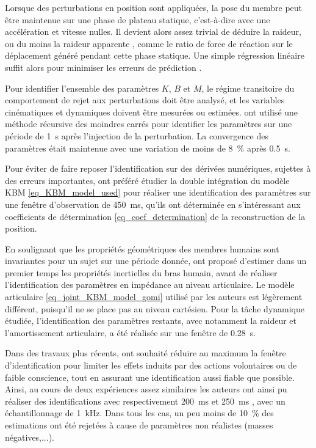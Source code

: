 Lorsque des perturbations en position sont appliquées, la pose du membre peut être maintenue sur une phase de plateau statique, c'est-à-dire avec une accélération et vitesse nulles. Il devient alors assez trivial de déduire la raideur, ou du moins la raideur apparente \parencite{latash_joint_1993}, comme le ratio de force de réaction sur le déplacement généré pendant cette phase statique. Une simple régression linéaire suffit alors pour minimiser les erreurs de prédiction \parencite{mussa-ivaldi_neural_1985,burdet_method_2000}.

Pour identifier l'ensemble des paramètres $K$, $B$ et $M$, le régime transitoire du comportement de rejet aux perturbations doit être analysé, et les variables cinématiques et dynamiques doivent être mesurées ou estimées. \textcite{dolan_dynamic_1993} ont utilisé une méthode récursive des moindres carrés pour identifier les paramètres sur une période de \SI{1}{\second} après l'injection de la perturbation. La convergence des paramètres était maintenue avec une variation de moins de \SI{8}{\percent} après \SI{0.5}{\second}. 

Pour éviter de faire reposer l'identification sur des dérivées numériques, sujettes à des erreurs importantes, \textcite{tsuji_human_1995} ont préféré étudier la double intégration du modèle KBM \cref{eq_KBM_model_used} pour réaliser une identification des paramètres sur une fenêtre d'observation de \SI{450}{\milli\second}, qu'ils ont déterminée en s'intéressant aux coefficients de détermination \cref{eq_coef_determination} de la reconstruction de la position.

En soulignant que les propriétés géométriques des membres humains sont invariantes pour un sujet sur une période donnée, \textcite{gomi_human_1997} ont proposé d'estimer dans un premier temps les propriétés inertielles du bras humain, avant de réaliser l'identification des paramètres en impédance au niveau articulaire. Le modèle articulaire \cref{eq_joint_KBM_model_gomi} utilisé par les auteurs est légèrement différent, puisqu'il ne se place pas au niveau cartésien. Pour la tâche dynamique étudiée, l'identification des paramètres restants, avec notamment la raideur et l'amortissement articulaire, a été réalisée sur une fenêtre de \SI{0.28}{\second}.

Dans des travaux plus récents, \textcite{erden_hand_2015} ont souhaité réduire au maximum la fenêtre d'identification pour limiter les effets induits par des actions volontaires ou de faible conscience, tout en assurant une identification aussi fiable que possible. Ainsi, au cours de deux expériences assez similaires les auteurs ont ainsi pu réaliser des identifications avec respectivement \SI{200}{\milli\second} \parencite{erden_end-point_2015} et \SI{250}{\milli\second} \parencite{erden_hand_2015}, avec un échantillonnage de \SI{1}{\kilo\hertz}. Dans tous les cas, un peu moins de \SI{10}{\percent} des estimations ont été rejetées à cause de paramètres non réalistes (masses négatives,...).

